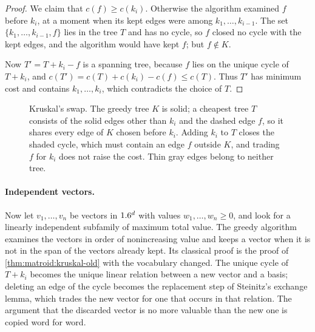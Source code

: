 \begin{refsection}
\begin{proof}
We claim that $c(f)\ge c(k_i)$. Otherwise the algorithm examined $f$ before $k_i$, at a moment when its kept edges were among $k_1,\dots,k_{i-1}$. The set $\{k_1,\dots,k_{i-1},f\}$ lies in the tree $T$ and has no cycle, so $f$ closed no cycle with the kept edges, and the algorithm would have kept $f$; but $f\notin K$.

Now $T'=T+k_i-f$ is a spanning tree, because $f$ lies on the unique cycle of $T+k_i$, and $c(T')=c(T)+c(k_i)-c(f)\le c(T)$. Thus $T'$ has minimum cost and contains $k_1,\dots,k_i$, which contradicts the choice of $T$.
\end{proof}

\begin{figure}[t]
\centering
{}
\caption{Kruskal's swap. The greedy tree $K$ is solid; a cheapest tree $T$ consists of the solid edges other than $k_i$ and the dashed edge $f$, so it shares every edge of $K$ chosen before $k_i$. Adding $k_i$ to $T$ closes the shaded cycle, which must contain an edge $f$ outside $K$, and trading $f$ for $k_i$ does not raise the cost. Thin gray edges belong to neither tree.}
\label{fig:matroid:kruskal}
\end{figure}

\paragraph{Independent vectors.} Now let $v_1,\dots,v_n$ be vectors in $1.6^d$ with values $w_1,\dots,w_n\ge0$, and look for a linearly independent subfamily of maximum total value. The greedy algorithm examines the vectors in order of nonincreasing value and keeps a vector when it is not in the span of the vectors already kept. Its classical proof is the proof of \cref{thm:matroid:kruskal-old} with the vocabulary changed. The unique cycle of $T+k_i$ becomes the unique linear relation between a new vector and a basis; deleting an edge of the cycle becomes the replacement step of Steinitz's exchange lemma, which trades the new vector for one that occurs in that relation. The argument that the discarded vector is no more valuable than the new one is copied word for word.


\end{refsection}
